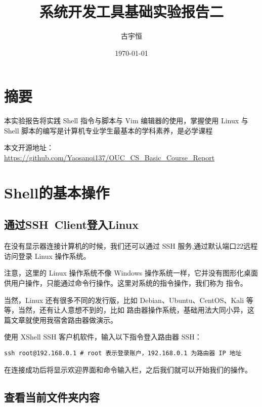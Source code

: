 \documentclass[UTF8]{gyh}
\title{系统开发工具基础实验报告二}
\author{古宇恒}
\date{\today}
\begin{document}
\fancyfoot[C]{\thepage}

\maketitle
\tableofcontents
\newpage

\section{摘要}
本实验报告将实践 Shell 指令与脚本与 Vim 编辑器的使用，掌握使用 Linux 与 Shell 脚本的编写是计算机专业学生最基本的学科素养，是必学课程

本文开源地址：\href{https://github.com/Yaosanqi137/OUC_CS_Basic_Course_Report}{https://github.com/Yaosanqi137/OUC\_CS\_Basic\_Course\_Report}

\section{Shell的基本操作}

\subsection{通过SSH\ Client登入Linux}

在没有显示器连接计算机的时候，我们还可以通过 SSH 服务,通过默认端口22远程访问登录 Linux 操作系统。

注意，这里的 Linux 操作系统不像 Windows 操作系统一样，它并没有图形化桌面供用户操作，只能通过命令行操作。这里对系统的指令操作，我们称为  指令。

当然，Linux 还有很多不同的发行版，比如 Debian、Ubuntu、CentOS、Kali 等等，当然，还有让人意想不到的，比如  路由器操作系统，基础用法大同小异，这篇文章就使用我宿舍路由器做演示。

使用 XShell SSH 客户机软件，输入以下指令登入路由器 SSH：

\begin{lstlisting}
ssh root@192.168.0.1 # root 表示登录账户，192.168.0.1 为路由器 IP 地址
\end{lstlisting}

在连接成功后将显示欢迎界面和命令输入栏，之后我们就可以开始我们的操作。


\subsection{查看当前文件夹内容}
\end{document}
